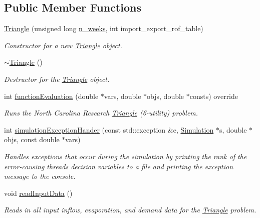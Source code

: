 \subsection*{Public Member Functions}
\begin{DoxyCompactItemize}
\item 
\mbox{\hyperlink{classTriangle_a24833bad242ddc3f671b36678dff5738}{Triangle}} (unsigned long \mbox{\hyperlink{classProblem_ac7513bb0ecdfa4bbb7d2ada3595d71ec}{n\+\_\+weeks}}, int import\+\_\+export\+\_\+rof\+\_\+table)
\begin{DoxyCompactList}\small\item\em Constructor for a new \mbox{\hyperlink{classTriangle}{Triangle}} object. \end{DoxyCompactList}\item 
\mbox{\hyperlink{classTriangle_a5199760a17454f4dc94c855a57e3a152}{$\sim$\+Triangle}} ()
\begin{DoxyCompactList}\small\item\em Destructor for the \mbox{\hyperlink{classTriangle}{Triangle}} object. \end{DoxyCompactList}\item 
int \mbox{\hyperlink{classTriangle_a9e95039d098fd61cce1a830b85ed7004}{function\+Evaluation}} (double $\ast$vars, double $\ast$objs, double $\ast$consts) override
\begin{DoxyCompactList}\small\item\em Runs the North Carolina Research \mbox{\hyperlink{classTriangle}{Triangle}} (6-\/utility) problem. \end{DoxyCompactList}\item 
int \mbox{\hyperlink{classTriangle_a816ff476231f6bd575c82978706f4b9a}{simulation\+Exception\+Hander}} (const std\+::exception \&e, \mbox{\hyperlink{classSimulation}{Simulation}} $\ast$s, double $\ast$objs, const double $\ast$vars)
\begin{DoxyCompactList}\small\item\em Handles exceptions that occur during the simulation by printing the rank of the error-\/causing thread\textquotesingle{}s decision variables to a file and printing the exception message to the console. \end{DoxyCompactList}\item 
void \mbox{\hyperlink{classTriangle_a045e3263a62a8a628fe5645f0323b7e4}{read\+Input\+Data}} ()
\begin{DoxyCompactList}\small\item\em Reads in all input inflow, evaporation, and demand data for the \mbox{\hyperlink{classTriangle}{Triangle}} problem. \end{DoxyCompactList}\end{DoxyCompactItemize}
